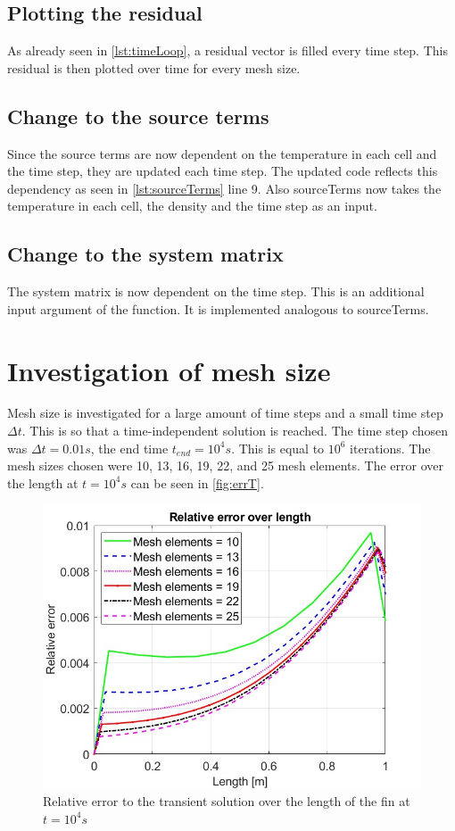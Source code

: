 \section{Plotting the residual}
As already seen in \autoref{lst:timeLoop}, a residual vector is filled every time step. This residual is then plotted over time for every mesh size.


\section{Change to the source terms}
Since the source terms are now dependent on the temperature in each cell and the time step, they are updated each time step. The updated code reflects this dependency as seen in \autoref{lst:sourceTerms} line 9. Also sourceTerms now takes the temperature in each cell, the density and the time step as an input.




\section{Change to the system matrix}
The system matrix is now dependent on the time step. This is an additional input argument of the function. It is implemented analogous to sourceTerms.




\chapter{Investigation of mesh size}


Mesh size is investigated for a large amount of time steps and a small time step $\Delta t$. This is so that a time-independent solution is reached. The time step chosen was $\Delta t = 0.01 s$, the end time $t_{end} = 10^4 s$. This is equal to $10^6$ iterations. The mesh sizes chosen were 10, 13, 16, 19, 22, and 25 mesh elements. The error over the length at $t = 10^4 s$ can be seen in \autoref{fig:errT}.


\begin{figure}[H]
    \centering
    \includegraphics[width=.75\textwidth]{figures/TsmalldtBigtErr.jpg}
    \caption{Relative error to the transient solution over the length of the fin at $t = 10^4 s$}
    \label{fig:errT}
\end{figure}




